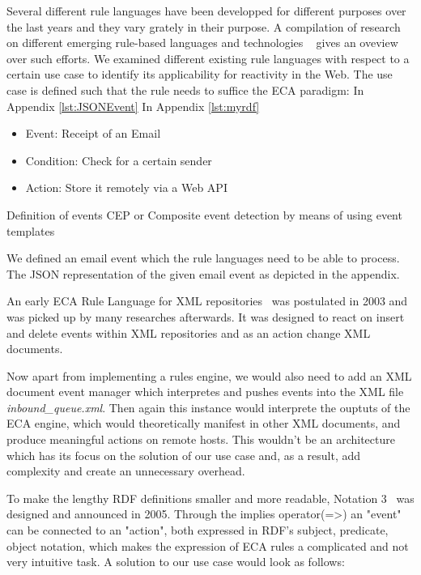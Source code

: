 Several different rule languages have been developped for different purposes over the last years and they vary grately in their purpose.
A compilation of research on different emerging rule-based languages and technologies ~\cite{2009-Paschke_Boley-RCER.pdf} gives an oveview over such efforts.
We examined different existing rule languages with respect to a certain use case to identify its applicability for reactivity in the Web. %
The use case is defined such that the rule needs to suffice the ECA paradigm:
In Appendix \ref{lst:JSONEvent}
In Appendix \ref{lst:myrdf}
\begin{itemize}
  \item Event: Receipt of an Email
  \item Condition: Check for a certain sender
  \item Action: Store it remotely via a Web API
\end{itemize}
Definition of events\cite{Adaikkalavan2007}
CEP or Composite event detection by means of using event templates\cite{Zhou2005}



We defined an email event which the rule languages need to be able to process.
The JSON representation of the given email event as depicted in the appendix. %


An early ECA Rule Language for XML repositories~\cite{Papamarkos03event-condition-actionrule} was postulated in 2003 and was picked up by many researches afterwards. It was designed to react on insert and delete events within XML repositories and as an action change XML documents.


Now apart from implementing a rules engine, we would also need to add an XML document event manager which interpretes and pushes events into the XML file \emph{inbound\_queue.xml}. Then again this instance would interprete the ouptuts of the ECA engine, which would theoretically manifest in other XML documents, and produce meaningful actions on remote hosts. This wouldn't be an architecture which has its focus on the solution of our use case and, as a result, add complexity and create an unnecessary overhead.

To make the lengthy RDF definitions smaller and more readable, Notation 3~\cite{wwwn3} was designed and announced in 2005. Through the implies operator(=\textgreater) an "event" can be connected to an "action", both expressed in RDF's subject, predicate, object notation, which makes the expression of ECA rules a complicated and not very intuitive task. A solution to our use case would look as follows:

